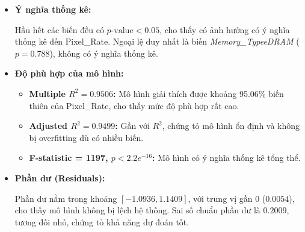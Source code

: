 \begin{itemize}
\begin{itemize}
        \item \textbf{\textit{Memory\_Type:}}
        \begin{itemize}
            \item \textbf{eDRAM:} Hệ số $-0.0422$, $p = 0.788 > 0.05$ $\Rightarrow$ không có ý nghĩa thống kê.
            \item \textbf{GDDR:} Hệ số $0.0617$, $p = 0.003 < 0.01$ $\Rightarrow$ có ảnh hưởng dương và có ý nghĩa.
        \end{itemize}

        \item \textbf{\textit{Resolution\_WxH:}}
        \begin{itemize}
            \item \textbf{Resolution 2:} Hệ số $0.0516$, $p = 0.0118 < 0.05$
            \item \textbf{Resolution 3:} Hệ số $0.0748$, $p = 0.0205 < 0.05$
        \end{itemize}
        $\Rightarrow$ Các độ phân giải cao hơn có xu hướng làm tăng Pixel\_Rate.
    \end{itemize}

    \item \textbf{Ý nghĩa thống kê:}

    Hầu hết các biến đều có $p\text{-value} < 0.05$, cho thấy có ảnh hưởng có ý nghĩa thống kê đến Pixel\_Rate. Ngoại lệ duy nhất là biến \textit{Memory\_TypeeDRAM} ($p = 0.788$), không có ý nghĩa thống kê.

    \item \textbf{Độ phù hợp của mô hình:}
    \begin{itemize}
        \item \textbf{Multiple $R^2 = 0.9506$:} Mô hình giải thích được khoảng 95.06\% biến thiên của Pixel\_Rate, cho thấy mức độ phù hợp rất cao.
        
        \item \textbf{Adjusted $R^2 = 0.9499$:} Gần với $R^2$, chứng tỏ mô hình ổn định và không bị overfitting dù có nhiều biến.
        
        \item \textbf{F-statistic = 1197, $p < 2.2e^{-16}$:} Mô hình có ý nghĩa thống kê tổng thể.
    \end{itemize}

    \item \textbf{Phần dư (Residuals):}

    Phần dư nằm trong khoảng $[-1.0936, 1.1409]$, với trung vị gần 0 ($0.0054$), cho thấy mô hình không bị lệch hệ thống. Sai số chuẩn phần dư là $0.2009$, tương đối nhỏ, chứng tỏ khả năng dự đoán tốt.

\end{itemize}

